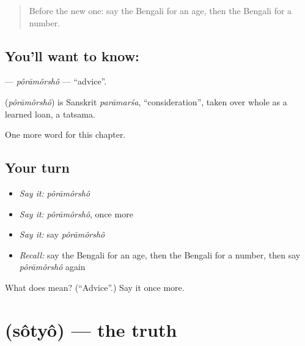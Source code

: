 \label{lesson:BN-C227-poramorsho}



\begin{quote}
Before the new one: say the Bengali for an age, then the Bengali for a number.
\end{quote}

\subsection*{You'll want to know: }
\textbf{} — \emph{pôrāmôrshô} — \textquotedblleft{}advice\textquotedblright{}.

\begin{cousinweb}
\textbf{} (\emph{pôrāmôrshô}) is Sanskrit \emph{parāmarśa}, \textquotedblleft{}consideration\textquotedblright{}, taken over whole as a learned loan, a tatsama.
\end{cousinweb}

\begin{grammarlens}[title={What you've built}]
One more word for this chapter.
\end{grammarlens}

\subsection*{Your turn}
\begin{itemize}
\raggedright
  \item \emph{Say it:} \emph{pôrāmôrshô}
  \item \emph{Say it:} \emph{pôrāmôrshô}, once more
  \item \emph{Say it:} say \emph{pôrāmôrshô}
  \item \emph{Recall:} say the Bengali for an age, then the Bengali for a number, then say \emph{pôrāmôrshô} again
\end{itemize}

\begin{tcolorbox}[breakable,colback=teal!4,colframe=teal!35!black,title={Before you move on}]
What does  mean? (\textquotedblleft{}Advice\textquotedblright{}.) Say it once more.
\end{tcolorbox}
\section[\texorpdfstring{\bn{সত্য} (sôtyô)}{সত্য (sôtyô)}]{ (sôtyô) — the truth}

\label{lesson:BN-C227-sotyo}



